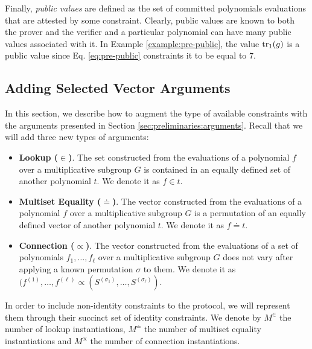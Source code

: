 Finally, \textit{public values} are defined as the set of committed polynomials evaluations that are attested by some constraint. Clearly, public values are known to both the prover and the verifier and a particular polynomial can have many public values associated with it. In Example \ref{example:pre-public}, the value $\text{tr}_1(g)$ is a public value since Eq. \eqref{eq:pre-public} constraints it to be equal to $7$. 


\subsection{Adding Selected Vector Arguments}\label{sec:vector-arguments}

In this section, we describe how to augment the type of available constraints
with the arguments presented in Section \ref{sec:preliminaries:arguments}.
Recall that we will add three new types of arguments:
\begin{itemize}
  \item \textbf{Lookup ($\in$)}. The set constructed from the evaluations of a polynomial $f$ over a multiplicative subgroup $G$ is contained in an equally defined set of another polynomial $t$. We denote it as $f \in t$.
  \item \textbf{Multiset Equality ($\doteq$)}. The vector constructed from the evaluations of a polynomial $f$ over a multiplicative subgroup $G$ is a permutation of an equally defined vector of another polynomial $t$. We denote it as $f \doteq t$.
  \item \textbf{Connection ($\propto$)}. The vector constructed from the evaluations of a set of polynomials $f_1,\dots,f_{\ell}$ over a multiplicative subgroup $G$ does not vary after applying a known permutation $\sigma$ to them. We denote it as $(f^{(1)},\dots,f^{(\ell)} \propto (S^{(\sigma_1)},\dots,S^{(\sigma_{\ell})})$.
\end{itemize}
In order to include non-identity constraints to the protocol, we will represent them through their succinct set of identity constraints. We denote by $M^{\in}$ the number of lookup instantiations, $M^{\doteq}$ the number of multiset equality instantiations and $M^{\propto}$ the number of connection instantiations.

